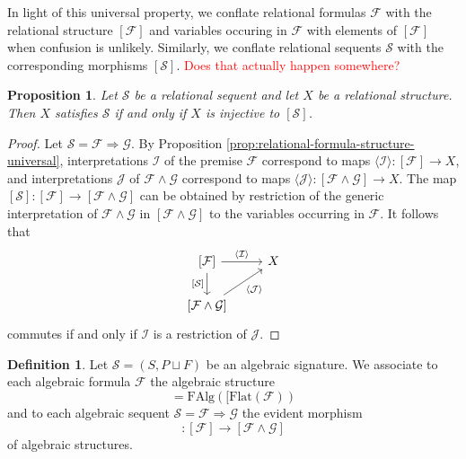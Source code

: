 \documentclass[a4paper]{article}
\newcommand{\todo}[1]{\textcolor{red}{#1}}
\newtheorem{proposition}[theorem]{Proposition}
\theoremstyle{remark}
\theoremstyle{definition}
\newtheorem{definition}[theorem]{Definition}
\begin{document}
In light of this universal property, we conflate relational formulas $\mathcal{F}$ with the relational structure $[\mathcal{F}]$ and variables occuring in $\mathcal{F}$ with elements of $[\mathcal{F}]$ when confusion is unlikely.
Similarly, we conflate relational sequents $\mathcal{S}$ with the corresponding morphisms $[\mathcal{S}]$.
\todo{
  Does that actually happen somewhere?
}

\begin{proposition}
  \label{prop:relational-sequent-morphism-lifts}
  Let $\mathcal{S}$ be a relational sequent and let $X$ be a relational structure.
  Then $X$ satisfies $\mathcal{S}$ if and only if $X$ is injective to $[\mathcal{S}]$.
\end{proposition}
\begin{proof}
  Let $\mathcal{S} = \mathcal{F} \Rightarrow \mathcal{G}$.
  By Proposition \ref{prop:relational-formula-structure-universal}, interpretations $\mathcal{I}$ of the premise $\mathcal{F}$ correspond to maps $\langle \mathcal{I} \rangle : [\mathcal{F}] \rightarrow X$, and interpretations $\mathcal{J}$ of $\mathcal{F} \land \mathcal{G}$ correspond to maps $\langle \mathcal{J} \rangle : [\mathcal{F} \land \mathcal{G}] \rightarrow X$.
  The map $[\mathcal{S}] : [\mathcal{F}] \rightarrow [\mathcal{F} \land \mathcal{G}]$ can be obtained by restriction of the generic interpretation of $\mathcal{F} \land \mathcal{G}$ in $[\mathcal{F} \land \mathcal{G}]$ to the variables occurring in $\mathcal{F}$.
  It follows that
  \begin{equation}
    \begin{tikzcd}
      \left[\mathcal{F}\right] \arrow[r, "\langle \mathcal{I} \rangle"] \arrow[d, "{[\mathcal{S}]}"'] & X \\
      \left[\mathcal{F} \land \mathcal{G}\right] \arrow[ur, "\langle \mathcal{J} \rangle"']
    \end{tikzcd}
  \end{equation}
  commutes if and only if $\mathcal{I}$ is a restriction of $\mathcal{J}$.
\end{proof}

\begin{definition}
  Let $\mathcal{S} = (S, P \sqcup F)$ be an algebraic signature.
  We associate to each algebraic formula $\mathcal{F}$ the algebraic structure
  \begin{equation}
    [\mathcal{F}] = \mathrm{FAlg}([\mathrm{Flat}(\mathcal{F}))
  \end{equation}
  and to each algebraic sequent $\mathcal{S} = \mathcal{F} \Rightarrow \mathcal{G}$ the evident morphism
  \begin{equation}
    [\mathcal{S}] : [\mathcal{F}] \rightarrow [\mathcal{F} \land \mathcal{G}]
  \end{equation}
  of algebraic structures.
\end{definition}
\end{document}
